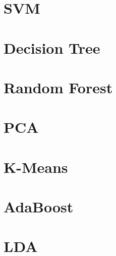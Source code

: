 \documentclass[12pt]{article}
\begin{document}
\section{SVM}

\section{Decision Tree}

\section{Random Forest}

\section{PCA}

\section{K-Means}

\section{AdaBoost}

\section{LDA}
\end{document}
